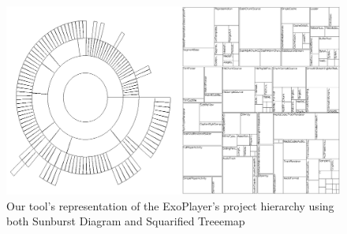 \begin{figure}[H]
  \centering
  \includegraphics[width=1\textwidth]{figures/sun_tree_comp.png}
  \caption{Our tool's representation of the ExoPlayer's project hierarchy using both Sunburst Diagram and Squarified Treeemap}
  \label{fig:sun_tree_comp}
\end{figure}

